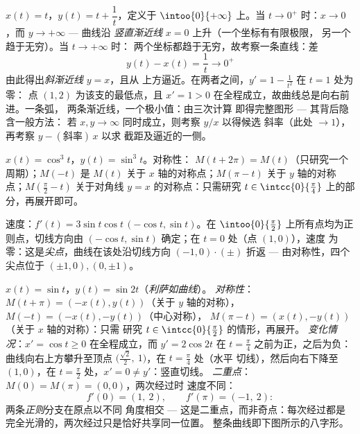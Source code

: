 \begin{example}[渐近分支，详解]
\label{ex:b1:curves:asymptotes}
$x(t) = t$，$y(t) = t + \dfrac1t$，定义于 $\intoo{0}{+\infty}$ 上。当 $t
\to 0^{+}$ 时：$x \to 0$，而 $y \to +\infty$ --- 曲线沿
\emph{竖直渐近线} $x = 0$ 上升（一个坐标有有限极限，
另一个趋于无穷）。当 $t \to +\infty$ 时：
两个坐标都趋于无穷，故考察一条直线：差
\[
y(t) - x(t) = \frac1t \longrightarrow 0^{+}
\]
由此得出\emph{斜渐近线} $y = x$，且从
上方逼近。在两者之间，$y' = 1 - \frac1{t^2}$ 在 $t = 1$ 处为零：
点 $(1, 2)$ 为该支的最低点，且 $x' = 1 >
0$ 在全程成立，故曲线总是向右前进。一条弧，
两条渐近线，一个极小值：由三次计算
即得完整图形 --- 其背后隐含一般方法：
若 $x, y \to \infty$ 同时成立，则考察 $y/x$ 以得候选
斜率（此处 $\to 1$），再考察 $y - (\text{斜率})\,x$ 以求
截距及逼近的一侧。
\end{example}

\begin{example}[星形线]\label{ex:b1:curves:astroid}
$x(t) = \cos^3 t$，$y(t) = \sin^3 t$。对称性：
$M(t + 2\pi) = M(t)$（只研究一个周期）；$M(-t)$ 是
$M(t)$ 关于 $x$ 轴的对称点；$M(\pi - t)$ 关于 $y$ 轴的对称点；$M(\frac\pi2 -
t)$ 关于对角线 $y = x$ 的对称点：只需研究 $t \in
\intcc{0}{\frac\pi4}$ 上的部分，再展开即可。

速度：$f'(t) = 3\sin t\cos t\,(-\cos t, \sin t)$。在
$\intoo{0}{\frac\pi2}$ 上所有点均为正则点，切线方向由
$(-\cos t, \sin t)$ 确定；在 $t = 0$ 处（点 $(1,0)$），速度
为零：这是\emph{尖点}，曲线在该处沿切线方向
$(-1, 0)\cdot(\pm)$ 折返 --- 由对称性，四个
尖点位于 $(\pm1, 0), (0, \pm1)$。
\end{example}

\begin{example}[八字形曲线的完整研究]
\label{ex:b1:curves:lissajous}
$x(t) = \sin t$，$y(t) = \sin 2t$（\emph{利萨如曲线}）。
\emph{对称性}：$M(t + \pi) = (-x(t), y(t))$（关于
$y$ 轴的对称），$M(-t) = (-x(t), -y(t))$（中心对称），
$M(\pi - t) = (x(t), -y(t))$（关于 $x$ 轴的对称）：只需
研究 $t \in \intcc{0}{\frac\pi2}$ 的情形，再展开。
\emph{变化情况}：$x' = \cos t \geq 0$ 在全程成立，而 $y' =
2\cos 2t$ 在 $t = \frac\pi4$ 之前为正，之后为负：
曲线向右上方攀升至顶点
$\bigl(\frac{\sqrt2}2,\ 1\bigr)$，在 $t = \frac\pi4$ 处（水平
切线），然后向右下降至 $(1, 0)$，在 $t =
\frac\pi2$ 处，$x' = 0 \neq y'$：竖直切线。
\emph{二重点}：$M(0) = M(\pi) = (0,0)$，两次经过时
速度不同：
\[
f'(0) = (1,\ 2), \qquad f'(\pi) = (-1,\ 2) :
\]
两条\emph{正则}分支在原点以不同
角度相交 --- 这是二重点，而非奇点：每次经过都是
完全光滑的，两次经过只是恰好共享同一位置。
整条曲线即下图所示的八字形。
\end{example}

